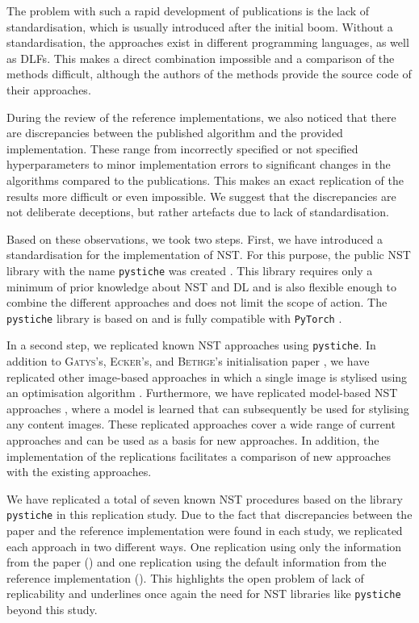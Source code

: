 The problem with such a rapid development of publications is the lack of standardisation, which is usually introduced after the initial boom. Without a standardisation, the approaches exist in different programming languages, as well as \glspl{DLF}. This makes a direct combination impossible and a comparison of the methods difficult, although the authors of the methods provide the source code of their approaches. 

During the review of the reference implementations, we also noticed that there are discrepancies between the published algorithm and the provided implementation. These range from incorrectly specified or not specified hyperparameters to minor implementation errors to significant changes in the algorithms compared to the publications. This makes an exact replication of the results more difficult or even impossible. We suggest that the discrepancies are not deliberate deceptions, but rather artefacts due to lack of standardisation. 

Based on these observations, we took two steps. First, we have introduced a standardisation for the implementation of \gls{NST}. For this purpose, the public \gls{NST} library with the name \texttt{pystiche} was created \cite{ML2020}. This library requires only a minimum of prior knowledge about \gls{NST} and \gls{DL} and is also flexible enough to combine the different approaches and does not limit the scope of action. The \texttt{pystiche} library is based on and is fully compatible with \texttt{PyTorch} \cite{PGM+2019}. 

In a second step, we replicated known \gls{NST} approaches using \texttt{pystiche}. In addition to \textsc{Gatys}'s, \textsc{Ecker}'s, and \textsc{Bethge}'s initialisation paper \cite{GEB2016}, we have replicated other image-based approaches in which a single image is stylised using an optimisation algorithm \cite{LW2016,GEB+2017}. Furthermore, we have replicated model-based \gls{NST} approaches \cite{JAL2016,ULVL2016,UVL2017}, where a model is learned that can subsequently be used for stylising any content images. These replicated approaches cover a wide range of current approaches and can be used as a basis for new approaches. In addition, the implementation of the replications facilitates a comparison of new approaches with the existing approaches. 

We have replicated a total of seven known \gls{NST} procedures based on the library \texttt{pystiche} in this replication study. Due to the fact that discrepancies between the paper and the reference implementation were found in each study, we replicated each approach in two different ways. One replication using only the information from the paper (\paper{}) and one replication using the default information from the reference implementation (\implementation{}). This highlights the open problem of lack of replicability and underlines once again the need for \gls{NST} libraries like \texttt{pystiche} beyond this study.

